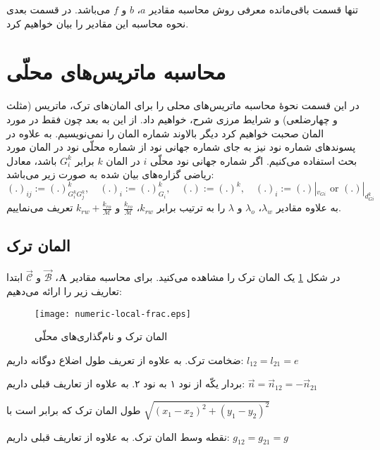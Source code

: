 تنها قسمت باقی‌مانده معرفی روش محاسبه مقادیر
 $a$، $b$ و $f$ 
می‌باشد. در قسمت بعدی نحوه محاسبه این مقادیر را بیان خواهیم کرد.
\section{محاسبه ماتریس‌های محلّی}
\label{ch:36}
در این قسمت نحوهٔ محاسبه ماتریس‌های محلی را برای المان‌های ترک، ماتریس (مثلث و چهارضلعی) و شرایط مرزی شرح، خواهیم داد. از این به بعد چون فقط در مورد المان صحبت خواهیم کرد دیگر بالاوند شماره المان را نمی‌نویسیم. به علاوه در پسوند‌های شماره نود نیز به جای شماره جهانی نود از شماره محلّی نود در المان مورد بحث استفاده می‌کنیم. اگر شماره جهانی نود محلّی $i$ در المان $k$ برابر $G_i^k$ باشد، معادل ریاضی گزاره‌های بیان شده به صورت زیر می‌باشد:
\begin{equation*}
(.)_{ij} := (.)^k_{{G_{i}^k}{G_{j}^k}}, \quad  (.)_i:=(.)_{G_i}^k, \quad
(.) := (.)^k,  \quad (.)_i := (.)|_{v_{Gi}}\text{ or }(.)|_{d_{Gi}^k} 
\end{equation*}
به علاوه مقادیر
$\lambda_w$، $\lambda_o$ و $\lambda$ 
را به ترتیب برابر 
$k_{rw}$، $\frac{k_{ro}}{\mathcal M}$ و $k_{rw}+\frac{k_{ro}}{\mathcal M}$ 
تعریف می‌نماییم.
\subsection{المان ترک}
در شکل \ref{fig:3frac} یک المان ترک را مشاهده می‌کنید. برای محاسبه مقادیر 
$\mathbf{A}$، $\vec{\mathcal B}$ و $\vec{\mathcal C}$
ابتدا تعاریف زیر را ارائه می‌دهیم:
\begin{figure}[h]
\texttt{[image: numeric-local-frac.eps]} 
\caption{المان ترک و نام‌گذاری‌های محلّی}
\label{fig:3frac}
\end{figure}

\begin{tight_itemize}
\item[$e$]
ضخامت ترک. به علاوه از تعریف طول اضلاع دوگانه داریم: $l_{12} = l_{21} = e$
\item[$\vec n$]
بردار یکّه از نود ۱ به نود ۲. به علاوه از تعاریف قبلی داریم:
$\vec n = \vec n_{12} = -\vec n_{21}$ 
\item[$l$]
طول المان ترک که برابر است با
$\sqrt{ \left( x_1 - x_2 \right)^2 + \left( y_1 - y_2 \right)^2 } $
\item[$g$]
نقطه وسط المان ترک. به علاوه از تعاریف قبلی داریم:  
$g_{12} = g_{21} = g$
\end{tight_itemize}

